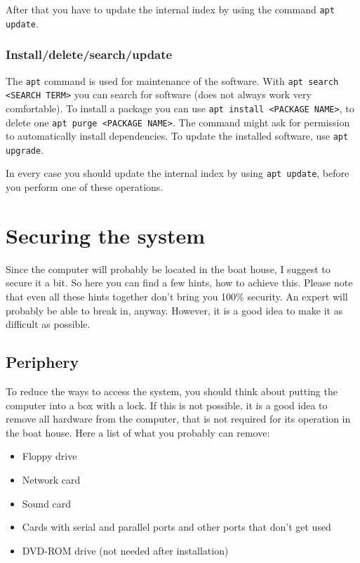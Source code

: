 \documentclass[a4paper,12pt,twoside]{article}
\begin{document}
\bigskip
After that you have to update the internal index by using the command
\texttt{apt update}.


\subsubsection{Install/delete/search/update}
\label{sct:software_install}
The \texttt{apt} command is used for maintenance
of the software. With \texttt{apt search {\textless}SEARCH
TERM{\textgreater}} you can search for software (does not
always work very comfortable). To install a package you can use
\texttt{apt install {\textless}PACKAGE
NAME{\textgreater}}, to delete one
\texttt{apt purge {\textless}PACKAGE
NAME{\textgreater}}. The command might ask for permission
to automatically install dependencies. To update the installed
software, use \texttt{apt upgrade}.

In every case you should update the internal index by using
\texttt{apt update}, before you perform one
of these operations.


\section{Securing the system}
\label{sct:system_secure}
Since the computer will probably be
located in the boat house, I suggest to secure it a bit. So here you
can find a few hints, how to achieve this. Please note that even all
these hints together don't bring you 100\% security.
An expert will probably be able to break in, anyway. However, it is a
good idea to make it as difficult as possible.


\subsection{Periphery}
\label{sct:periphery}
To reduce the ways to access the system, you should think about putting
the computer into a box with a lock. If this is not possible, it is a 
good idea to remove all hardware from the computer, that is not
required for its operation in the boat house. Here a list of what you
probably can remove:

\begin{itemize}
    \item Floppy drive
    \item Network card
    \item Sound card
    \item Cards with serial and parallel ports and other ports that
        don't get used
    \item DVD-ROM drive (not needed after installation)
\end{itemize}
\end{document}
